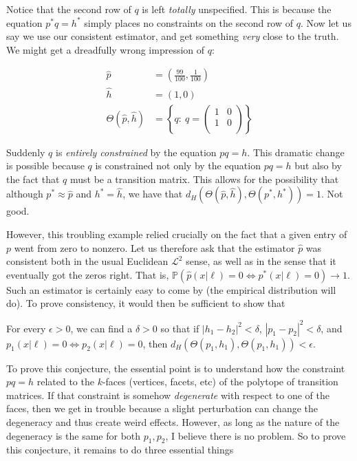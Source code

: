 Notice that the second row of $q$ is left \emph{totally} unspecified.  This is because the equation $p^*q=h^*$ simply places no constraints on the second row of $q$.  Now let us say we use our consistent estimator, and get something \emph{very} close to the truth.  We might get a dreadfully wrong impression of $q$:

\begin{align*}
\hat p &= \left(\frac{99}{100}, \frac{1}{100}\right)\\
\hat h &= (1, 0)\\
\Theta(\hat p,\hat h) &= 
  \left\{q:\ q=\left(\begin{array}{cc}
  1 & 0 \\
  1 & 0 \\
  \end{array}\right)\right\}
\end{align*}

Suddenly $q$ is \emph{entirely constrained} by the equation $pq=h$.  This dramatic change is possible because $q$ is constrained not only by the equation $pq=h$ but also by the fact that $q$ must be a transition matrix.  This allows for the possibility that although $p^*\approx \hat p$ and $h^*=\hat h$, we have that $d_H(\Theta(\hat p,\hat h),\Theta(p^*,h^*))=1$.  Not good.

However, this troubling example relied crucially on the fact that a given entry of $p$ went from zero to nonzero.  Let us therefore ask that the estimator $\hat p$ was consistent both in the usual Euclidean $\mathscr L^2$ sense, as well as in the sense that it eventually got the zeros right.  That is, $\mathbb P(\hat p(x|\ell)=0\Leftrightarrow p^*(x|\ell)=0) \rightarrow 1$.  Such an estimator is certainly easy to come by (the empirical distribution will do).  To prove consistency, it would then be sufficient to show that

\vspace{.1in}
\begin{conj}
For every $\epsilon>0$, we can find a $\delta>0$ so that if $|h_1 -h_2|^2<\delta$, $|p_1 -p_2|^2<\delta$, and $p_1(x|\ell)=0\Leftrightarrow p_2(x|\ell)=0$, then $d_H(\Theta(p_1,h_1),\Theta(p_1,h_1))<\epsilon$.
\end{conj}

To prove this conjecture, the essential point is to understand how the constraint $pq=h$ related to the $k$-faces (vertices, facets, etc) of the polytope of transition matrices.  If that constraint is somehow \emph{degenerate} with respect to one of the faces, then we get in trouble because a slight perturbation can change the degeneracy and thus create weird effects.  However, as long as the nature of the degeneracy is the same for both $p_1,p_2$, I believe there is no problem.  So to prove this conjecture, it remains to do three essential things

